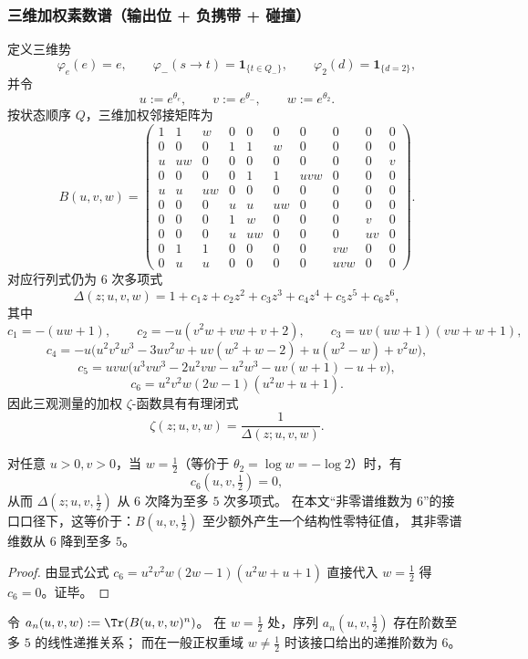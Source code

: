 \subsubsection{三维加权素数谱（输出位 + 负携带 + 碰撞）}
定义三维势
\[
\varphi_e(e)=e,\qquad
\varphi_-(s\to t)=\mathbf{1}_{\{t\in Q_-\}},\qquad
\varphi_2(d)=\mathbf{1}_{\{d=2\}},
\]
并令
\[
u:=e^{\theta_e},\qquad v:=e^{\theta_-},\qquad w:=e^{\theta_2}.
\]
按状态顺序 $Q$，三维加权邻接矩阵为
\[
B(u,v,w)=
\begin{pmatrix}
1 & 1 & w & 0 & 0 & 0 & 0 & 0 & 0 & 0\\
0 & 0 & 0 & 1 & 1 & w & 0 & 0 & 0 & 0\\
u & uw & 0 & 0 & 0 & 0 & 0 & 0 & 0 & v\\
0 & 0 & 0 & 0 & 1 & 1 & uvw & 0 & 0 & 0\\
u & u & uw & 0 & 0 & 0 & 0 & 0 & 0 & 0\\
0 & 0 & 0 & u & u & uw & 0 & 0 & 0 & 0\\
0 & 0 & 0 & 1 & w & 0 & 0 & 0 & v & 0\\
0 & 0 & 0 & u & uw & 0 & 0 & 0 & uv & 0\\
0 & 1 & 1 & 0 & 0 & 0 & 0 & vw & 0 & 0\\
0 & u & u & 0 & 0 & 0 & 0 & uvw & 0 & 0
\end{pmatrix}.
\]
对应行列式仍为 6 次多项式
\[
\Delta(z;u,v,w)=1+c_1z+c_2z^2+c_3z^3+c_4z^4+c_5z^5+c_6z^6,
\]
其中
\[
c_1=-(uw+1),\qquad
c_2=-u(v^2w+vw+v+2),\qquad
c_3=uv(uw+1)(vw+w+1),
\]
\[
c_4=-u\bigl(u^2v^2w^3-3uv^2w+uv(w^2+w-2)+u(w^2-w)+v^2w\bigr),
\]
\[
c_5=uvw\bigl(u^3 v w^3-2u^2 v w-u^2 w^3-u v(w+1)-u+v\bigr),
\]
\[
c_6=u^2 v^2 w(2w-1)(u^2w+u+1).
\]
因此三观测量的加权 $\zeta$-函数具有有理闭式
\[
\zeta(z;u,v,w)=\frac{1}{\Delta(z;u,v,w)}.
\]
\begin{proposition}[内部临界超平面 \texorpdfstring{$w=\frac12$}{w=1/2}：有效谱维数的一阶坍缩]\label{prop:sync-kernel-3d-critical-w-half}
对任意 \(u>0,v>0\)，当 \(w=\tfrac12\)（等价于 \(\theta_2=\log w=-\log 2\)）时，有
\[
c_6(u,v,\tfrac12)=0,
\]
从而
\(
\Delta(z;u,v,\tfrac12)
\)
从 \(6\) 次降为至多 \(5\) 次多项式。
在本文“非零谱维数为 \(6\)”的接口口径下，这等价于：\(B(u,v,\tfrac12)\) 至少额外产生一个结构性零特征值，
其非零谱维数从 \(6\) 降到至多 \(5\)。
\end{proposition}
\begin{proof}
由显式公式 \(c_6=u^2v^2w(2w-1)(u^2w+u+1)\) 直接代入 \(w=\tfrac12\) 得 \(c_6=0\)。证毕。
\end{proof}

\begin{corollary}\label{cor:sync-kernel-3d-recurrence-drop}
令 \(a_n(u,v,w):=\Tr(B(u,v,w)^n)\)。
在 \(w=\tfrac12\) 处，序列 \(a_n(u,v,\tfrac12)\) 存在阶数至多 \(5\) 的线性递推关系；
而在一般正权重域 \(w\neq\tfrac12\) 时该接口给出的递推阶数为 \(6\)。
\end{corollary}

